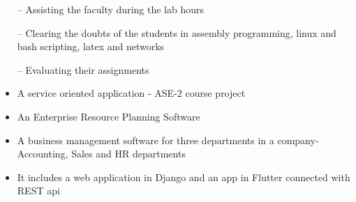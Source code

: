\documentclass[10pt,a4paper]{altacv}
\begin{document}
\tagline{}

%

\begin{fullwidth}
\makecvheader
\end{fullwidth}

%





\begin{itemize}
    \setlength{\itemindent}{0.5em}
    \item[--]   \small{Assisting the faculty during the lab hours}
    \item[--]   \small{Clearing the doubts of the students in assembly programming, linux and bash scripting, latex and networks}
    \item[--]   \small{Evaluating their assignments}
\end{itemize}

\medskip






\begin{itemize}
  \item \small{A service oriented application - ASE-2 course project }
  \item An Enterprise Resource Planning Software
  \item A business management software for three departments in a company- Accounting, Sales and HR departments
  \item It includes a web application in Django and an app in Flutter connected with REST api
\end{itemize}
\end{document}
